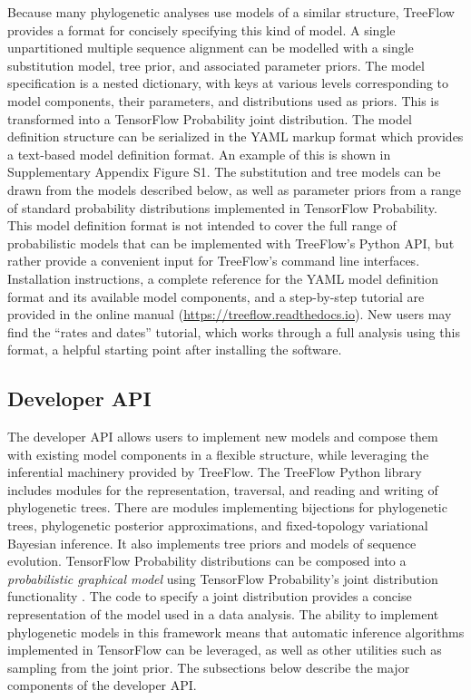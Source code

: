 \documentclass[oupdraft]{sysbio_sse}
\let\cite\citep
\begin{document}
Because many phylogenetic analyses use models of a similar structure, TreeFlow provides a format for concisely specifying this kind of model. A single unpartitioned multiple sequence alignment can be modelled with a single substitution model, tree prior, and associated parameter priors. The model specification is a nested dictionary, with keys at various levels corresponding to model components, their parameters, and distributions used as priors. This is transformed into a TensorFlow Probability joint distribution. The model definition structure can be serialized in the YAML markup format which provides a text-based model definition format. An example of this is shown in Supplementary Appendix Figure S1. The substitution and tree models can be drawn from the models described below, as well as parameter priors from a range of standard probability distributions implemented in TensorFlow Probability. This model definition format is not intended to cover the full range of probabilistic models that can be implemented with TreeFlow's Python API, but rather provide a convenient input for TreeFlow's command line interfaces. Installation instructions, a complete reference for the YAML model definition format and its available model components, and a step-by-step tutorial are provided in the online manual (\url{https://treeflow.readthedocs.io}). New users may find the ``rates and dates'' tutorial, which works through a full analysis using this format, a helpful starting point after installing the software.

\subsection{Developer API}

The developer API allows users to implement new models and compose them with existing model components in a flexible structure, while leveraging the inferential machinery provided by TreeFlow. The TreeFlow Python library includes modules for the representation, traversal, and reading and writing of phylogenetic trees. There are modules implementing bijections for phylogenetic trees, phylogenetic posterior approximations, and fixed-topology variational Bayesian inference. It also implements tree priors and models of sequence evolution. TensorFlow Probability distributions can be composed into a \textit{probabilistic graphical model} using TensorFlow Probability's joint distribution functionality \cite{piponi2020joint}. The code to specify a joint distribution provides a concise representation of the model used in a data analysis. The ability to implement phylogenetic models in this framework means that automatic inference algorithms implemented in TensorFlow can be leveraged, as well as other utilities such as sampling from the joint prior. The subsections below describe the major components of the developer API.
\end{document}
